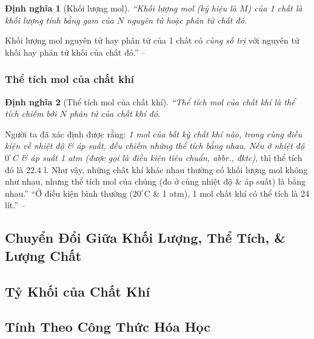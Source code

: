 \documentclass{article}
\numberwithin{equation}{section}
\newtheorem{dinhnghia}{Định nghĩa}[section]
\begin{document}
\begin{dinhnghia}[Khối lượng mol]
	``\emph{Khối lượng mol} (ký hiệu là $M$) của 1 chất là khối lượng tính bằng gam của $N$ nguyên tử hoặc phân tử chất đó.
\end{dinhnghia}
Khối lượng mol nguyên tử hay phân tử của 1 chất có \textit{cùng số trị} với nguyên tử khối hay phân tử khối của chất đó.'' -- \cite[p. 63]{SGK_Hoa_Hoc_8}

\subsubsection{Thể tích mol của chất khí}

\begin{dinhnghia}[Thể tích mol của chất khí]
	``\emph{Thể tích mol của chất khí} là thể tích chiếm bởi $N$ phân tử của chất khí đó.
\end{dinhnghia}
Người ta đã xác định được rằng: \textit{1 mol của bất kỳ chất khí nào, trong cùng điều kiện về nhiệt độ \& áp suất, đều chiếm những thể tích bằng nhau. Nếu ở nhiệt độ $0^\circ$C \& áp suất 1 atm (được gọi là \emph{điều kiện tiêu chuẩn}, abbr., \emph{đktc})}, thì thể tích đó là $22.4$ l. Như vậy, những chất khí khác nhau thường có khối lượng mol không như nhau, nhưng thể tích mol của chúng (đo ở cùng nhiệt độ \& áp suất) là bằng nhau.'' ``Ở điều kiện bình thường ($20^\circ$C \& 1 atm), 1 mol chất khí có thể tích là 24 lít.'' -- \cite[pp. 63--64]{SGK_Hoa_Hoc_8}


\subsection{Chuyển Đổi Giữa Khối Lượng, Thể Tích, \& Lượng Chất}


\subsection{Tỷ Khối của Chất Khí}


\subsection{Tính Theo Công Thức Hóa Học}
\end{document}
